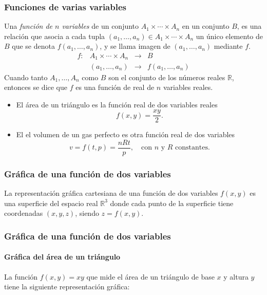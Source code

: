 \begin{frame}
\frametitle{Funciones de varias variables}
\begin{definicion}
Una \emph{función de $n$ variables} de un conjunto $A_1\times \cdots \times A_n$ en un conjunto $B$, es una relación que asocia a cada tupla $(a_1,\ldots,a_n)\in A_1\times \cdots\times A_n$ un único elemento de $B$ que se denota $f(a_1,\ldots,a_n)$, y se llama imagen de $(a_1,\ldots,a_n)$ mediante $f$.
\[
\begin{array}{lccc}
f: & A_1\times\cdots\times A_n & \longrightarrow & B\\
   &(a_1,\ldots,a_n) & \longrightarrow & f(a_1,\ldots,a_n)
\end{array}
\]
Cuando tanto $A_1,\ldots,A_n$ como $B$ son el conjunto de los números reales $\mathbb{R}$, entonces se dice que $f$ es una función de real de $n$ variables reales.
\end{definicion}

\begin{itemize}
\item El área de un triángulo es la función real de dos variables reales 
\[ f(x,y)=\frac{xy}{2}.\]
\item El el volumen de un gas perfecto es otra función real de dos variables
\[
v=f(t,p)=\frac{nRt}{p},\quad \mbox{con $n$ y $R$ constantes.}
\]
\end{itemize}
\end{frame}


\begin{frame}
\frametitle{Gráfica de una función de dos variables}
La representación gráfica cartesiana de una función de dos variables $f(x,y)$ es una superficie del espacio real $\mathbb{R}^3$ donde cada punto de la superficie tiene coordenadas $(x,y,z)$, siendo $z=f(x,y)$.
\begin{center}
\scalebox{1}{}
\end{center}
\end{frame}


\begin{frame}
\frametitle{Gráfica de una función de dos variables}
\framesubtitle{Gráfica del área de un triángulo}
La función $f(x,y)=xy$ que mide el área de un triángulo de base $x$ y altura $y$ tiene la siguiente representación gráfica:
\begin{center}
\scalebox{1}{}
\end{center}
\end{frame}


